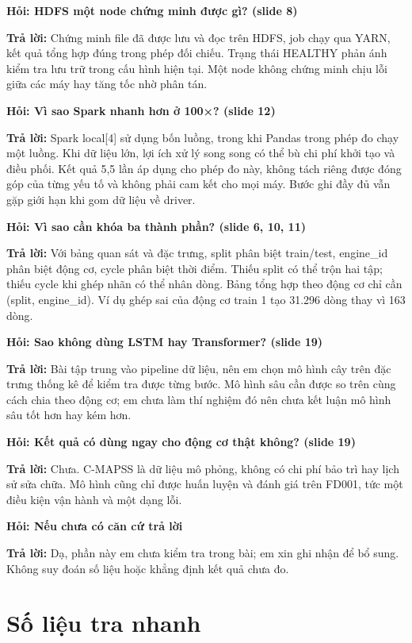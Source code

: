 \documentclass[11pt,a4paper]{article}
\newcommand{\qa}[2]{\par\medskip\noindent\textbf{\textcolor{iuhblue}{Hỏi:} #1}\par\noindent\textbf{Trả lời:} #2\par}
\begin{document}
\qa{HDFS một node chứng minh được gì? (slide 8)}{Chứng minh file đã được lưu và
đọc trên HDFS, job chạy qua YARN, kết quả tổng hợp đúng trong phép đối chiếu.
Trạng thái HEALTHY phản ánh kiểm tra lưu trữ trong cấu hình hiện tại. Một node
không chứng minh chịu lỗi giữa các máy hay tăng tốc nhờ phân tán.}

\qa{Vì sao Spark nhanh hơn ở 100×? (slide 12)}{Spark local[4] sử dụng bốn luồng,
trong khi Pandas trong phép đo chạy một luồng. Khi dữ liệu lớn, lợi ích xử lý song
song có thể bù chi phí khởi tạo và điều phối. Kết quả 5,5 lần áp dụng cho phép đo
này, không tách riêng được đóng góp của từng yếu tố và không phải cam kết cho mọi
máy. Bước ghi đầy đủ vẫn gặp giới hạn khi gom dữ liệu về driver.}

\qa{Vì sao cần khóa ba thành phần? (slide 6, 10, 11)}{Với bảng quan sát và đặc
trưng, split phân biệt train/test, engine\_id phân biệt động cơ, cycle phân biệt
thời điểm. Thiếu split có thể trộn hai tập; thiếu cycle khi ghép nhãn có thể nhân
dòng. Bảng tổng hợp theo động cơ chỉ cần (split, engine\_id). Ví dụ ghép sai của
động cơ train 1 tạo 31.296 dòng thay vì 163 dòng.}

\qa{Sao không dùng LSTM hay Transformer? (slide 19)}{Bài tập trung vào pipeline
dữ liệu, nên em chọn mô hình cây trên đặc trưng thống kê để kiểm tra được từng
bước. Mô hình sâu cần được so trên cùng cách chia theo động cơ; em chưa làm thí
nghiệm đó nên chưa kết luận mô hình sâu tốt hơn hay kém hơn.}

\qa{Kết quả có dùng ngay cho động cơ thật không? (slide 19)}{Chưa. C-MAPSS là dữ
liệu mô phỏng, không có chi phí bảo trì hay lịch sử sửa chữa. Mô hình cũng chỉ
được huấn luyện và đánh giá trên FD001, tức một điều kiện vận hành và một dạng lỗi.}

\qa{Nếu chưa có căn cứ trả lời}{Dạ, phần này em chưa kiểm tra trong bài; em xin
ghi nhận để bổ sung. Không suy đoán số liệu hoặc khẳng định kết quả chưa đo.}
\clearpage
\section*{Số liệu tra nhanh}
\end{document}
